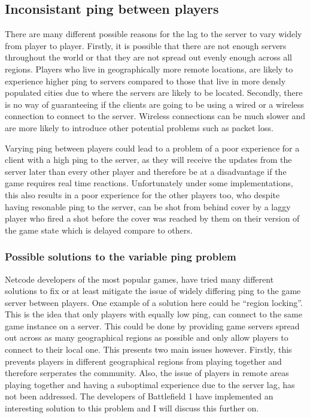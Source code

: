 \subsection{Inconsistant ping between players}
There are many different possible reasons for the lag to the server to vary widely from player to player. Firstly, it is possible that there are not enough servers throughout the world or that they are not spread out evenly enough across all regions. Players who live in geographically more remote locations, are likely to experience higher ping to servers compared to those that live in more densly populated cities due to where the servers are likely to be located. Secondly, there is no way of guaranteeing if the clients are going to be using a wired or a wireless connection to connect to the server. Wireless connections can be much slower and are more likely to introduce other potential problems such as packet loss.

Varying ping between players could lead to a problem of a poor experience for a client with a high ping to the server, as they will receive the updates from the server later than every other player and therefore be at a disadvantage if the game requires real time reactions. Unfortunately under some implementations, this also results in a poor experience for the other players too, who despite having resonable ping to the server, can be shot from behind cover by a laggy player who fired a shot before the cover was reached by them on their version of the game state which is delayed compare to others.


\subsubsection{Possible solutions to the variable ping problem}
Netcode developers of the most popular games, have tried many different solutions to fix or at least mitigate the issue of widely differing ping to the game server between players. One example of a solution here could be ``region locking''. This is the idea that only players with equally low ping, can connect to the same game instance on a server. This could be done by providing game servers spread out across as many geographical regions as possible and only allow players to connect to their local one. This presents two main issues however. Firstly, this prevents players in different geographical regions from playing together and therefore serperates the community. Also, the issue of players in remote areas playing together and having a suboptimal experience due to the server lag, has not been addressed. The developers of Battlefield 1 have implemented an interesting solution to this problem and I will discuss this further on.


